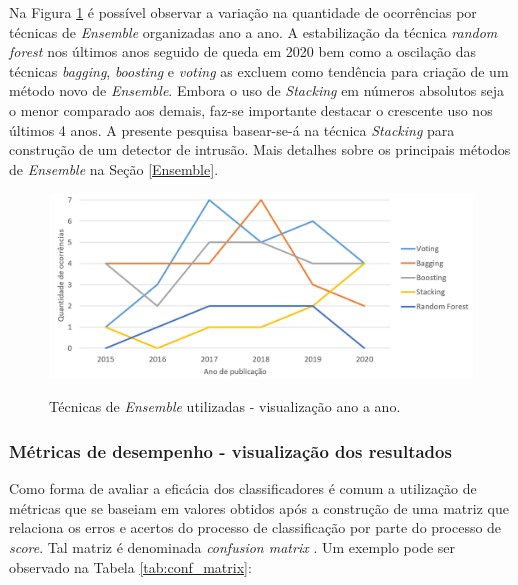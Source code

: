 Na Figura \ref{fig:tend_Ensemble} é possível observar a variação na quantidade de ocorrências por técnicas de \textit{Ensemble} organizadas ano a ano. A estabilização da técnica \textit{random forest} nos últimos anos seguido de queda em 2020 bem como a oscilação das técnicas \textit{bagging}, \textit{boosting} e \textit{voting} as excluem como tendência para criação de um método novo de \textit{Ensemble}. Embora o uso de \textit{Stacking} em números absolutos seja o menor comparado aos demais, faz-se importante destacar o crescente uso nos últimos 4 anos. A presente pesquisa basear-se-á na técnica \textit{Stacking} para construção de um detector de intrusão. Mais detalhes sobre os principais métodos de \textit{Ensemble} na Seção \ref{Ensemble}.



\begin{figure}[H]
\centering
\caption{Técnicas de \textit{Ensemble} utilizadas - visualização ano a ano.} \includegraphics[width=\textwidth,keepaspectratio]{figs/tendencias_Ensemble.png}
\newline {}\label{fig:tend_Ensemble}
\end{figure}






\subsubsection{Métricas de desempenho - visualização dos resultados}
\label{sub-metricas}
Como forma de avaliar a eficácia dos classificadores é comum a utilização de métricas que se baseiam em valores obtidos após a construção de uma matriz que relaciona os erros e acertos do processo de classificação por parte do processo de \textit{score}. Tal matriz é denominada \textit{confusion matrix} \cite{sokolova2006beyond}. Um exemplo pode ser observado na Tabela \ref{tab:conf_matrix}:






